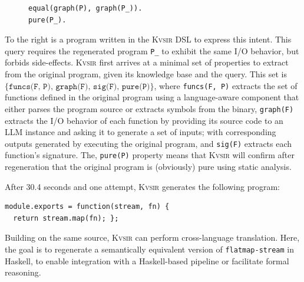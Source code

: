 \documentclass[noacm,sigplan,review]{acmart}
\newcommand{\sys}{{\scshape Kv{\textalpha}sir}\xspace}
\newcommand{\ttt}[1]{\texttt{#1}\xspace}
\begin{document}
\begin{figure}
\vspace{-10pt}
\begin{verbatim}
equal(graph(P), graph(P_)).
pure(P_).
\end{verbatim}
\end{figure}
To the right is a program written in the \sys DSL to express this intent.
This query requires the regenerated program \ttt{P\_} to exhibit the same I/O behavior,
but forbids side-effects.
\sys first arrives at a minimal set of properties to extract from the
original program, given its knowledge base and the query.
This set is $\{\texttt{funcs(F, P), graph(F), sig(F), pure(P)}\}$, where
\texttt{funcs(F, P)} extracts the set of functions defined in the original program
using a language-aware component that either parses the program source or extracts
symbols from the binary,
\texttt{graph(F)} extracts the I/O behavior of each function
by providing its source code to an LLM instance and asking it to generate a set of
inputs; with corresponding outputs generated by executing the original program,
and \texttt{sig(F)} extracts each function's signature.
The, \texttt{pure(P)} property means that \sys will confirm after regeneration that the original program is (obviously) pure
using static analysis.

After 30.4 seconds and one attempt, \sys generates the following program:
\begin{verbatim}
module.exports = function(stream, fn) {
  return stream.map(fn); };
\end{verbatim}


Building on the same source, \sys can perform cross-language
translation. 
Here, the goal is to regenerate a semantically equivalent version
of \texttt{flatmap-stream} in Haskell, to enable integration with a
Haskell-based pipeline or facilitate formal reasoning.
\end{document}

